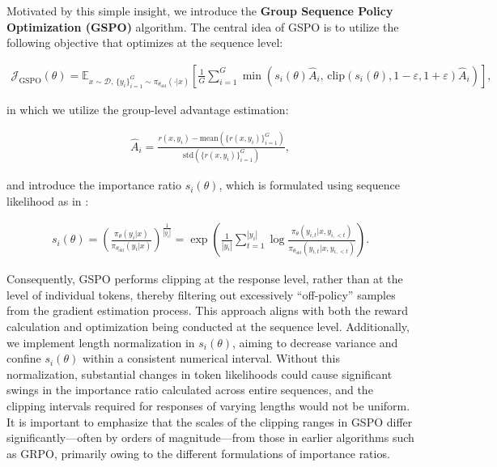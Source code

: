 Motivated by this simple insight, we introduce the \textbf{Group Sequence Policy Optimization (GSPO)} algorithm. The central idea of GSPO is to utilize the following objective that optimizes at the sequence level:

\begin{align}
\mathcal{J}_\text{GSPO} (\theta) =
\mathbb{E}_{ x \sim \mathcal{D},\, \{y_i\}_{i=1}^G \sim \pi_{\theta_\text{old}}( \cdot | x) }
\left[ 
\frac{1}{G} \sum_{i=1}^{G}
\min \left( s_{i}(\theta)  \widehat{A}_{i},  \, \mathrm{clip} \left( s_{i}(\theta), 1 - {\varepsilon}, 1 + {\varepsilon} \right) \widehat{A}_{i} \right) 
\right],
\label{equ:gspo}
\end{align}

in which we utilize the group-level advantage estimation:

\begin{align}
\widehat{A}_{i} = \frac{r(x, y_i) - \mathrm{mean} \left( \{ r(x, y_i) \}_{i=1}^G \right) }{ \mathrm{std} \left( \{ r(x, y_i) \}_{i=1}^G \right) },
\end{align}

and introduce the importance ratio $s_{i}(\theta)$, which is formulated using sequence likelihood as in \citet{click}:

\begin{align}
s_{i}(\theta) = \left( \frac{ \pi_{\theta} (y_i | x) }{ \pi_{\theta_\text{old}} (y_i | x)} \right)^{\frac{1}{|y_i|}}
=
\exp \left( \frac{1}{|y_i|} \sum_{t=1}^{|y_i|} \log \frac{ \pi_{\theta} (y_{i,t} | x, y_{i,<t}) }{ \pi_{\theta_\text{old}} (y_{i,t} | x,y_{i,<t})} \right).
\end{align}

Consequently, GSPO performs clipping at the response level, rather than at the level of individual tokens, thereby filtering out excessively ``off-policy'' samples from the gradient estimation process. This approach aligns with both the reward calculation and optimization being conducted at the sequence level. Additionally, we implement length normalization in $s_{i}(\theta)$, aiming to decrease variance and confine $s_{i}(\theta)$ within a consistent numerical interval. Without this normalization, substantial changes in token likelihoods could cause significant swings in the importance ratio calculated across entire sequences, and the clipping intervals required for responses of varying lengths would not be uniform. It is important to emphasize that the scales of the clipping ranges in GSPO differ significantly—often by orders of magnitude—from those in earlier algorithms such as GRPO, primarily owing to the different formulations of importance ratios.

